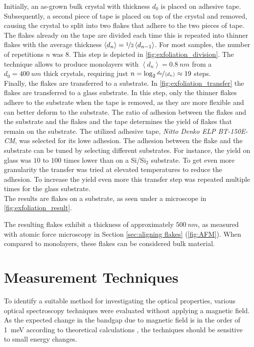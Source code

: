 \documentclass[
	twoside,
	parskip=half,
	a4paper,
]{scrbook}
\begin{document}
Initially, an as-grown bulk crystal with thickness $d_0$ is placed on adhesive tape.
Subsequently, a second piece of tape is placed on top of the crystal and removed, causing the crystal to split into two flakes that adhere to the two pieces of tape.
The flakes already on the tape are divided each time this is repeated into thinner flakes with the average thickness $\left< d_{n} \right> = \nicefrac{1}{2} \left< d_{n-1} \right>$.
For most samples, the number of repetitions $n$ was $8$.
This step is depicted in \autoref{fig:exfoliation_division}.
The technique allows to produce monolayers with $ \left<d_n\right>  = \SI{0.8}{nm}$ \cite{NiPS3_few_layer} from a $d_0 = \SI{400}{um}$ thick crystals, requiring just $n = \log_2 \nicefrac{d_0}{\left<d_n\right>} \approx 19$ steps.\\
Finally, the flakes are transferred to a substrate.
In \autoref{fig:exfoliation_transfer} the flakes are transferred to a glass substrate.
In this step, only the thinner flakes adhere to the substrate when the tape is removed, as they are more flexible and can better deform to the substrate.
The ratio of adhesion between the flakes and the substrate and the flakes and the tape determines the yield of flakes that remain on the substrate.
The utilized adhesive tape, \textit{Nitto Denko ELP BT-150E-CM}, was selected for its lowe adhesion.
The adhesion between the flake and the substrate can be tuned by selecting different substrates.
For instance, the yield on glass was $10$ to $100$ times lower than on a Si/Si$_2$ substrate.
To get even more granularity the transfer was tried at elevated temperatures to reduce the adhesion.
To increase the yield even more this transfer step was repeated multiple times for the glass substrate.\\
The results are flakes on a substrate, as seen under a microscope in \autoref{fig:exfoliation_result}.

The resulting flakes exhibit a thickness of approximately $\SI{500}{nm}$, as measured with atomic force microscopy in Section \ref{sec:aligning flakes} (\autoref{fig:AFM}).
When compared to monolayers, these flakes can be considered bulk material.


\section{Measurement Techniques}
To identify a suitable method for investigating the optical properties, various optical spectroscopy techniques were evaluated without applying a magnetic field. \\
As the expected change in the bandgap due to magnetic field is in the order of \SI{1}{meV} according to theoretical calculations \cite{MPX_first_principles}, the techniques should be sensitive to small energy changes.
\end{document}
